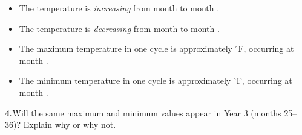 \documentclass[10pt]{article}
\begin{document}
\begin{tcolorbox}[colback=white, colframe=black!40,
    title=\textbf{Tier R --- Reinforce},
    fonttitle=\bfseries, arc=2mm, left=3mm, right=3mm, top=2mm, bottom=2mm]
\vspace{4pt}
\begin{itemize}[leftmargin=1.4em, itemsep=4pt]
  \item The temperature is \emph{increasing} from month
    \underline{\hspace{0.8cm}} to month \underline{\hspace{0.8cm}}.
  \item The temperature is \emph{decreasing} from month
    \underline{\hspace{0.8cm}} to month \underline{\hspace{0.8cm}}.
  \item The maximum temperature in one cycle is approximately
    \underline{\hspace{1.5cm}}${}^\circ$F, occurring at month
    \underline{\hspace{0.8cm}}.
  \item The minimum temperature in one cycle is approximately
    \underline{\hspace{1.5cm}}${}^\circ$F, occurring at month
    \underline{\hspace{0.8cm}}.
\end{itemize}

\vspace{4pt}
\textbf{4.}\quad Will the same maximum and minimum values appear in Year 3
(months 25--36)? Explain why or why not.

\end{tcolorbox}

\vspace{0.08in}
\end{document}
